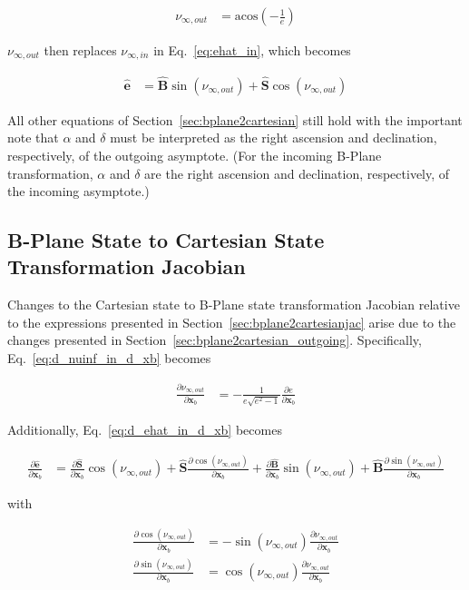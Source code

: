 \documentclass[]{article}
\newcommand{\vb}[1]{\bm{#1}} %
\newcommand{\vbh}[1]{\hat{\bm{#1}}} %
\newcommand{\pd}[2]{\frac{\partial #1}{\partial #2}} %
\newcommand{\xb}[0]{\vb{x}_b}
\begin{document}
\begin{align}
	\nu_{\infty, out} &= \mathrm{acos} \left(-\frac{1}{e} \right)
\end{align}

\noindent $\nu_{\infty, out}$ then replaces $\nu_{\infty, in}$ in Eq.~\eqref{eq:ehat_in}, which becomes

\begin{align}
	\vbh{e} &= \vbh{B} \sin \left( \nu_{\infty, out} \right) + \vbh{S} \cos \left( \nu_{\infty, out} \right)
\end{align}

All other equations of Section~\ref{sec:bplane2cartesian} still hold with the important note that $\alpha$ and $\delta$ must be interpreted as the right ascension and declination, respectively, of the outgoing asymptote. (For the incoming B-Plane transformation, $\alpha$ and $\delta$ are the right ascension and declination, respectively, of the incoming asymptote.)

\subsection{B-Plane State to Cartesian State Transformation Jacobian}
\label{sec:bplane2cartesianjac_outgoing}

Changes to the Cartesian state to B-Plane state transformation Jacobian relative to the expressions presented in Section~\ref{sec:bplane2cartesianjac} arise due to the changes presented in Section~\ref{sec:bplane2cartesian_outgoing}. Specifically, Eq.~\eqref{eq:d_nuinf_in_d_xb} becomes

\begin{align}
	\pd{\nu_{\infty, out}}{\xb} &= - \frac{1}{e \sqrt{e^2 - 1}} \pd{e}{\xb} 
\end{align}

Additionally, Eq.~\eqref{eq:d_ehat_in_d_xb} becomes

\begin{align}
	\pd{\vbh{e}}{\xb} &= \pd{\vbh{S}}{\xb} \cos \left( \nu_{\infty, out} \right) + \vbh{S} \pd{\cos \left( \nu_{\infty, out} \right)}{\xb}  + \pd{\vbh{B}}{\xb} \sin \left( \nu_{\infty, out} \right) + \vbh{B} \pd{\sin \left( \nu_{\infty, out} \right)}{\xb}
\end{align}

\noindent with

\begin{align}
	\pd{\cos \left( \nu_{\infty, out} \right)}{\xb} &= - \sin \left( \nu_{\infty, out} \right) \pd{\nu_{\infty, out}}{\xb} \\
	\pd{\sin \left( \nu_{\infty, out} \right)}{\xb} &= \cos \left( \nu_{\infty, out} \right) \pd{\nu_{\infty, out}}{\xb}
\end{align}
\end{document}
